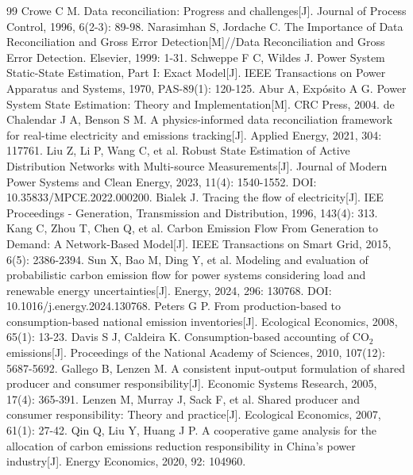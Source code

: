 \documentclass[UTF8,a4paper,zihao=-4,fontset=fandol]{ctexart}
\begin{document}
\begin{sloppypar}
\begin{thebibliography}{99}
 Crowe C M. Data reconciliation: Progress and challenges[J]. Journal of Process Control, 1996, 6(2-3): 89-98.
 Narasimhan S, Jordache C. The Importance of Data Reconciliation and Gross Error Detection[M]//Data Reconciliation and Gross Error Detection. Elsevier, 1999: 1-31.
 Schweppe F C, Wildes J. Power System Static-State Estimation, Part I: Exact Model[J]. IEEE Transactions on Power Apparatus and Systems, 1970, PAS-89(1): 120-125.
 Abur A, Expósito A G. Power System State Estimation: Theory and Implementation[M]. CRC Press, 2004.
 de Chalendar J A, Benson S M. A physics-informed data reconciliation framework for real-time electricity and emissions tracking[J]. Applied Energy, 2021, 304: 117761.
 Liu Z, Li P, Wang C, et al. Robust State Estimation of Active Distribution Networks with Multi-source Measurements[J]. Journal of Modern Power Systems and Clean Energy, 2023, 11(4): 1540-1552. DOI: 10.35833/MPCE.2022.000200.
 Bialek J. Tracing the flow of electricity[J]. IEE Proceedings - Generation, Transmission and Distribution, 1996, 143(4): 313.
 Kang C, Zhou T, Chen Q, et al. Carbon Emission Flow From Generation to Demand: A Network-Based Model[J]. IEEE Transactions on Smart Grid, 2015, 6(5): 2386-2394.
 Sun X, Bao M, Ding Y, et al. Modeling and evaluation of probabilistic carbon emission flow for power systems considering load and renewable energy uncertainties[J]. Energy, 2024, 296: 130768. DOI: 10.1016/j.energy.2024.130768.
 Peters G P. From production-based to consumption-based national emission inventories[J]. Ecological Economics, 2008, 65(1): 13-23.
 Davis S J, Caldeira K. Consumption-based accounting of CO$_2$ emissions[J]. Proceedings of the National Academy of Sciences, 2010, 107(12): 5687-5692.
 Gallego B, Lenzen M. A consistent input-output formulation of shared producer and consumer responsibility[J]. Economic Systems Research, 2005, 17(4): 365-391.
 Lenzen M, Murray J, Sack F, et al. Shared producer and consumer responsibility: Theory and practice[J]. Ecological Economics, 2007, 61(1): 27-42.
 Qin Q, Liu Y, Huang J P. A cooperative game analysis for the allocation of carbon emissions reduction responsibility in China's power industry[J]. Energy Economics, 2020, 92: 104960.

\end{thebibliography}
\end{sloppypar}
\end{document}
